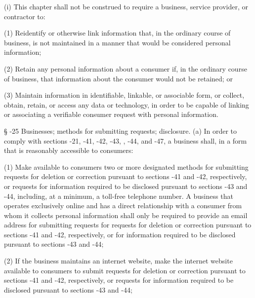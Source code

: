      (i)  This chapter shall not be construed to require a business, service provider, or contractor to:

     (1)  Reidentify or otherwise link information that, in the ordinary course of business, is not maintained in a manner that would be considered personal information;

     (2)  Retain any personal information about a consumer if, in the ordinary course of business, that information about the consumer would not be retained; or

     (3)  Maintain information in identifiable, linkable, or associable form, or collect, obtain, retain, or access any data or technology, in order to be capable of linking or associating a verifiable consumer request with personal information.

     §   -25  Businesses; methods for submitting requests; disclosure.  (a)  In order to comply with sections    -21,    ‑41,    -42,    -43, ,    -44, and    -47, a business shall, in a form that is reasonably accessible to consumers:

     (1)  Make available to consumers two or more designated methods for submitting requests for deletion or correction pursuant to sections    -41 and    -42, respectively, or requests for information required to be disclosed pursuant to sections    -43 and    -44, including, at a minimum, a toll-free telephone number.  A business that operates exclusively online and has a direct relationship with a consumer from whom it collects personal information shall only be required to provide an email address for submitting requests for requests for deletion or correction pursuant to sections    -41 and    -42, respectively, or for information required to be disclosed pursuant to sections    -43 and    -44;

     (2)  If the business maintains an internet website, make the internet website available to consumers to submit requests for deletion or correction pursuant to sections    -41 and    -42, respectively, or requests for information required to be disclosed pursuant to sections    -43 and    -44;

